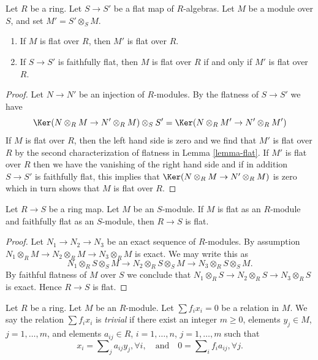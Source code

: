 \begin{lemma}
\label{lemma-flatness-descends-more-general}
Let $R$ be a ring. Let $S \to S'$ be a flat map of $R$-algebras.
Let $M$ be a module over $S$, and set $M' = S' \otimes_S M$.
\begin{enumerate}
\item If $M$ is flat over $R$, then $M'$ is flat over $R$.
\item If $S \to S'$ is faithfully flat, then $M$ is flat
over $R$ if and only if $M'$ is flat over $R$.
\end{enumerate}
\end{lemma}

\begin{proof}
Let $N \to N'$ be an injection of $R$-modules. By the flatness
of $S \to S'$ we have
$$
\Ker(N \otimes_R M \to N' \otimes_R M) \otimes_S S'
=
\Ker(N \otimes_R M' \to N' \otimes_R M')
$$
If $M$ is flat over $R$, then the left hand side is zero and
we find that $M'$ is flat over $R$ by the second characterization
of flatness in Lemma \ref{lemma-flat}.
If $M'$ is flat over $R$ then we have the vanishing of the right hand side
and if in addition $S \to S'$ is faithfully flat, this implies that
$\Ker(N \otimes_R M \to N' \otimes_R M)$ is zero which in turn
shows that $M$ is flat over $R$.
\end{proof}

\begin{lemma}
\label{lemma-flat-permanence}
Let $R \to S$ be a ring map. Let $M$ be an $S$-module.
If $M$ is flat as an $R$-module and faithfully flat as an $S$-module,
then $R \to S$ is flat.
\end{lemma}

\begin{proof}
Let $N_1 \to N_2 \to N_3$ be an exact sequence of $R$-modules.
By assumption $N_1 \otimes_R M \to N_2 \otimes_R M \to N_3 \otimes_R M$
is exact. We may write this as
$$
N_1 \otimes_R S \otimes_S M
\to
N_2 \otimes_R S \otimes_S M
\to
N_3 \otimes_R S \otimes_S M.
$$
By faithful flatness of $M$ over $S$ we conclude that
$N_1 \otimes_R S \to N_2 \otimes_R S \to N_3 \otimes_R S$ is exact.
Hence $R \to S$ is flat.
\end{proof}

\noindent
Let $R$ be a ring.
Let $M$ be an $R$-module.
Let $\sum f_i x_i = 0$ be a relation in $M$.
We say the relation $\sum f_i x_i$
is {\it trivial} if there exist an integer $m \geq 0$,
elements $y_j \in M$, $j = 1, \ldots, m$, and elements $a_{ij} \in R$,
$i = 1, \ldots, n$, $j = 1, \ldots, m$ such that
$$
x_i = \sum\nolimits_j a_{ij} y_j, \forall i,
\quad\text{and}\quad
0 = \sum\nolimits_i f_ia_{ij}, \forall j.
$$

